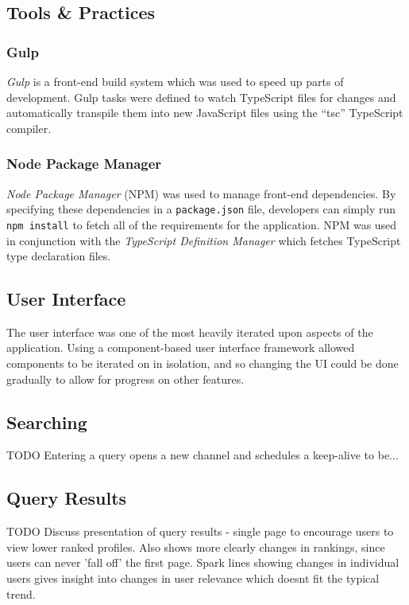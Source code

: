 \documentclass{l4proj}
\newcommand{\code}[1]{\texttt{#1}}
\begin{document}
        \subsection{Tools \& Practices}

        \subsubsection{Gulp}
        \textit{Gulp} is a front-end build system which was used to speed up parts of development. Gulp tasks were defined to watch TypeScript files for changes and automatically transpile them into new JavaScript files using the ``tsc'' TypeScript compiler.
        
        \subsubsection{Node Package Manager}
        \textit{Node Package Manager} (NPM) was used to manage front-end dependencies. By specifying these dependencies in a \code{package.json} file, developers can simply run \code{npm install} to fetch all of the requirements for the application. NPM was used in conjunction with the \textit{TypeScript Definition Manager} which fetches TypeScript type declaration files.
        \subsection{User Interface}
        The user interface was one of the most heavily iterated upon aspects of the application. Using a component-based user interface framework allowed components to be iterated on in isolation, and so changing the UI could be done gradually to allow for progress on other features.
        
        \subsection{Searching}
        TODO Entering a query opens a new channel and schedules a keep-alive to be...
        
        \subsection{Query Results}
        TODO Discuss presentation of query results - single page to encourage users to view lower ranked profiles. Also shows more clearly changes in rankings, since users can never 'fall off' the first page. Spark lines showing changes in individual users gives insight into changes in user relevance which doesnt fit the typical trend.
        
\end{document}
